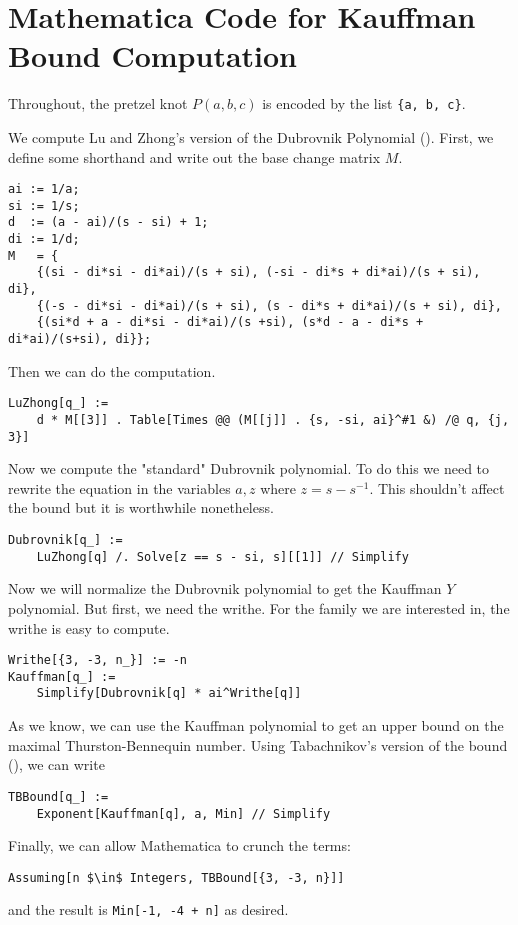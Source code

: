 \chapter{Mathematica Code for Kauffman Bound Computation}
\lstset{language=Mathematica,style=better}
Throughout, the pretzel knot $P(a, b, c)$ is encoded by the list \lstinline|{a, b, c}|.

We compute Lu and Zhong's version of the Dubrovnik Polynomial (\cite{lu-zhong}).
First, we define some shorthand and write out the base change matrix $M$.
\begin{lstlisting}
ai := 1/a;
si := 1/s;
d  := (a - ai)/(s - si) + 1;
di := 1/d;
M   = {
    {(si - di*si - di*ai)/(s + si), (-si - di*s + di*ai)/(s + si), di},
    {(-s - di*si - di*ai)/(s + si), (s - di*s + di*ai)/(s + si), di},
    {(si*d + a - di*si - di*ai)/(s +si), (s*d - a - di*s + di*ai)/(s+si), di}};
\end{lstlisting}

Then we can do the computation. 
\begin{lstlisting}
LuZhong[q_] :=
    d * M[[3]] . Table[Times @@ (M[[j]] . {s, -si, ai}^#1 &) /@ q, {j, 3}]
\end{lstlisting}

Now we compute the "standard" Dubrovnik polynomial. To do this we need to rewrite the equation in the variables $a, z$ where $z = s - s^{-1}$. This shouldn't affect the bound but it is worthwhile nonetheless.

\begin{lstlisting}
Dubrovnik[q_] :=
 	LuZhong[q] /. Solve[z == s - si, s][[1]] // Simplify
\end{lstlisting}

Now we will normalize the Dubrovnik polynomial to get the Kauffman $Y$ polynomial. But first, we need the writhe. For the family we are interested in, the writhe is easy to compute.

\begin{lstlisting}
Writhe[{3, -3, n_}] := -n
Kauffman[q_] :=
    Simplify[Dubrovnik[q] * ai^Writhe[q]]
\end{lstlisting}

As we know, we can use the Kauffman polynomial to get an upper bound on the maximal Thurston-Bennequin number. Using Tabachnikov's version of the bound (\cite{tabachnikov}), we can write

\begin{lstlisting}
TBBound[q_] :=
    Exponent[Kauffman[q], a, Min] // Simplify
\end{lstlisting}

Finally, we can allow Mathematica to crunch the terms:
\begin{lstlisting}[mathescape]
Assuming[n $\in$ Integers, TBBound[{3, -3, n}]]
\end{lstlisting}
and the result is \lstinline|Min[-1, -4 + n]| as desired.
